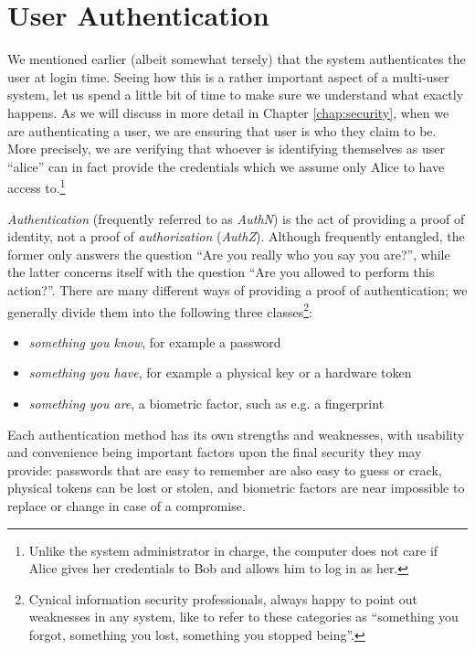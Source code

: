 \section{User Authentication}
\label{multi-user:authentication}

We mentioned earlier (albeit somewhat tersely) that
the system authenticates the user at login time.
Seeing how this is a rather important aspect of a
multi-user system, let us spend a little bit of time
to make sure we understand what exactly happens.  As
we will discuss in more detail in Chapter
\ref{chap:security}, when we are authenticating a
user, we are ensuring that user is who they claim to
be.  More precisely, we are verifying that whoever is
identifying themselves as user ``alice'' can in fact
provide the credentials which we assume only Alice to
have access to.\footnote{Unlike the system
administrator in charge, the computer does not care if
Alice gives her credentials to Bob and allows him to
log in as her.}

{\em Authentication} (frequently referred to as {\em
AuthN}) is the act of providing a proof of identity,
not a proof of {\em authorization} ({\em AuthZ}).
Although frequently entangled, the former only answers
the question ``Are you really who you say you are?'',
while the latter concerns itself with the question
``Are you allowed to perform this action?''.  There
are many different ways of providing a proof of
authentication; we generally divide them into the
following three classes\footnote{Cynical information
security professionals, always happy to point out
weaknesses in any system, like to refer to these
categories as ``something you forgot, something you
lost, something you stopped being''.}:

\begin{itemize}
	\item {\em something you know}, for example a password
	\item {\em something you have}, for example a
		physical key or a hardware token
	\item {\em something you are}, a biometric
		factor, such as e.g. a fingerprint
\end{itemize}

Each authentication method has its own strengths and
weaknesses, with usability and convenience being
important factors upon the final security they may
provide:  passwords that are easy to remember are also
easy to guess or crack, physical tokens can be lost or
stolen, and biometric factors are near impossible to
replace or change in case of a compromise.

